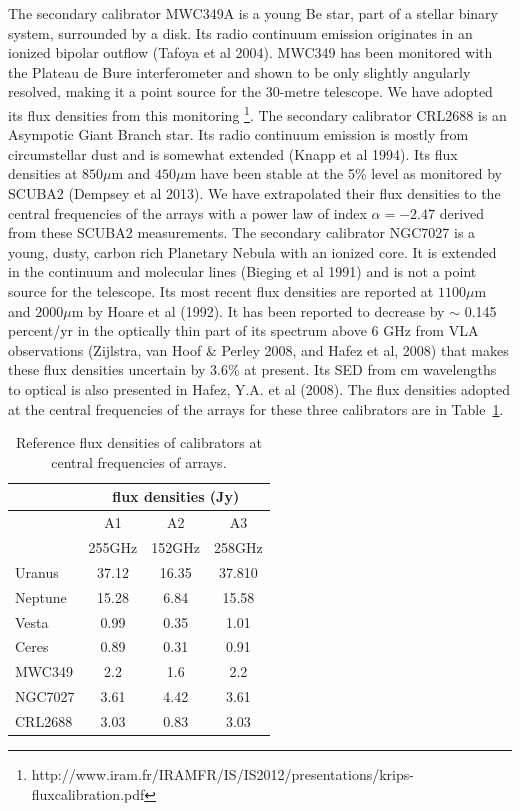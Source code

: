 The secondary calibrator MWC349A is a young Be star, part of a stellar binary system, surrounded by a disk. Its radio
continuum emission originates in an ionized bipolar outflow (Tafoya et al 2004).
MWC349 has been monitored with the  Plateau de Bure interferometer
and shown to be only slightly angularly resolved, making it a point source for the 30-metre telescope. We have adopted
its flux densities from this monitoring \footnote{http://www.iram.fr/IRAMFR/IS/IS2012/presentations/krips-fluxcalibration.pdf}.
The secondary calibrator CRL2688 is an Asympotic Giant Branch star. Its radio continuum emission is mostly from circumstellar dust and
is somewhat extended  (Knapp et al 1994).
Its flux densities at $850\mu$m  and $450\mu$m  have been stable at the 5\% level as monitored by SCUBA2 (Dempsey et al 2013).
We have extrapolated their flux densities to the central frequencies
of the arrays with a power law of index $\alpha=-2.47$ derived from these SCUBA2 measurements.
The secondary calibrator NGC7027 is a young, dusty, carbon rich Planetary Nebula with an ionized core.
It is extended in the continuum and molecular lines (Bieging et al 1991) and  is not a point source for the telescope.
Its  most recent flux densities are reported at $1100\mu$m  and $2000\mu$m by Hoare et al (1992). It has been reported
to decrease by $\sim$ 0.145 percent/yr in the optically thin part of its spectrum above  $6$ GHz from VLA
observations (Zijlstra, van Hoof \& Perley 2008, and Hafez et al, 2008) that makes these flux densities uncertain by 3.6\%
at present. Its SED from cm wavelengths to optical is also presented in Hafez, Y.A. et al (2008).
The flux densities adopted at the central frequencies of the arrays for these three calibrators are in Table~\ref{tab:fluxPred}.


\begin{table}
\centering
\label{tab:fluxPred}
\caption[]{Reference flux densities of calibrators at central frequencies of arrays.}
\begin{tabular}{|l|c|c|c|}
\hline
\multicolumn{1}{|c}{}  & \multicolumn{3}{|c|}{flux densities (Jy)}  \\
\hline
         &    A1      &  A2   &   A3    \\
         &  255GHz    & 152GHz  &  258GHz \\
\hline
Uranus   &  37.12   & 16.35 &  37.810 \\
Neptune  &  15.28   &  6.84 &  15.58  \\
Vesta    &   0.99   &  0.35 &   1.01  \\
Ceres    &   0.89   &  0.31 &   0.91   \\
MWC349   &   2.2    &  1.6  &   2.2   \\
NGC7027  &   3.61   &  4.42 &   3.61  \\
CRL2688  &   3.03   &  0.83 &   3.03  \\
\hline
\end{tabular}
\end{table}



